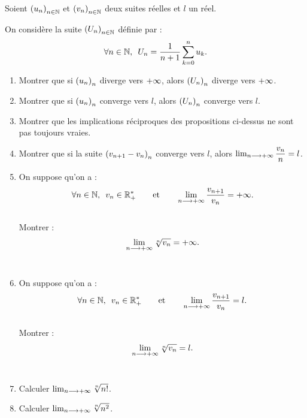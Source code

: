 \begin{exo}
Soient \(\left(u_n\right)_{n\in\mathbb{N}}\) et \(\left(v_n\right)_{n\in\mathbb{N}}\) deux suites réelles et \(l\) un réel.

On considère la suite \(\left(U_n\right)_{n\in\mathbb{N}}\) définie par : \[\quantifs{\forall n\in\N}U_n=\dfrac{1}{n+1}\sum_{k=0}^{n}u_k.\]

\begin{enumerate}
\item Montrer que si \(\left(u_n\right)_n\) diverge vers \(+\infty\), alors \(\left(U_n\right)_n\) diverge vers \(+\infty\). \\

\item Montrer que si \(\left(u_n\right)_n\) converge vers \(l\), alors \(\left(U_n\right)_n\) converge vers \(l\). \\

\item Montrer que les implications réciproques des propositions ci-dessus ne sont pas toujours vraies. \\

\item Montrer que si la suite \(\left(v_{n+1}-v_n\right)_n\) converge vers \(l\), alors \(\lim_{n\longrightarrow+\infty}\dfrac{v_n}{n}=l\). \\

\item On suppose qu'on a : \[\quantifs{\forall n\in\N}v_n\in\Rps\qquad\text{et}\qquad\lim_{n\to\pinf}\dfrac{v_{n+1}}{v_n}=\pinf.\] \\

Montrer : \[\lim_{n\longrightarrow+\infty}\sqrt[n]{v_n}=+\infty.\] \\

\item On suppose qu'on a : \[\quantifs{\forall n\in\N}v_n\in\Rps\qquad\text{et}\qquad\lim_{n\to\pinf}\dfrac{v_{n+1}}{v_n}=l.\] \\

Montrer : \[\lim_{n\longrightarrow+\infty}\sqrt[n]{v_n}=l.\] \\

\item Calculer \(\lim_{n\longrightarrow+\infty}\sqrt[n]{n!}\). \\

\item Calculer \(\lim_{n\longrightarrow+\infty}\sqrt[n]{n^2}\).
\end{enumerate}
\end{exo}

